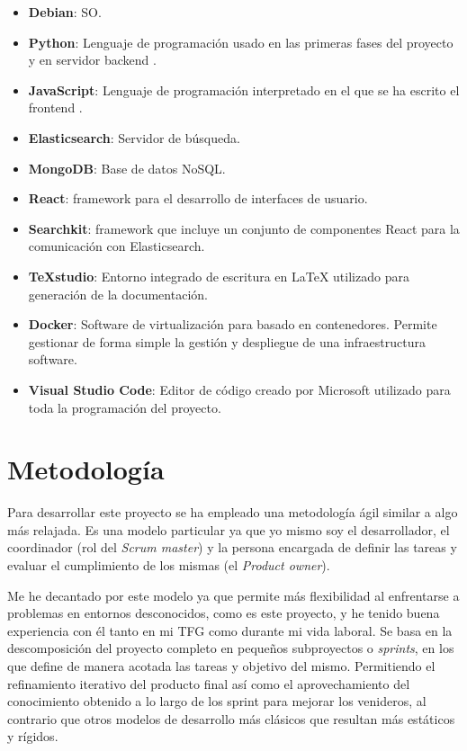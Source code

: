 \begin{itemize}
	\item \textbf{Debian}: \acrfull{SO}.
	\item \textbf{Python}: Lenguaje de programación usado en las primeras fases del proyecto y en servidor \gls{backend} .
	\item \textbf{JavaScript}: Lenguaje de programación interpretado en el que se ha escrito el \gls{frontend} .
	\item \textbf{Elasticsearch}: Servidor de búsqueda.
	\item \textbf{MongoDB}: Base de datos NoSQL.
	\item \textbf{React}:  \Gls{framework} para el desarrollo de interfaces de usuario.
	\item \textbf{Searchkit}: \Gls{framework} que incluye un conjunto de componentes React para la comunicación con Elasticsearch.
	\item \textbf{TeXstudio}: Entorno integrado de escritura en \LaTeX{} utilizado para generación de la documentación.
	\item \textbf{Docker}: Software de virtualización para basado en contenedores. Permite gestionar de forma simple la gestión y despliegue de una infraestructura software.
	\item \textbf{Visual Studio Code}: Editor de código creado por Microsoft utilizado para toda la programación del proyecto.
	
\end{itemize}

\section{Metodología}
\label{sc:metodologia}
Para desarrollar este proyecto se ha empleado una metodología ágil similar a \textit{}  algo más relajada. Es una modelo particular ya que yo mismo soy el desarrollador, el coordinador (rol del \textit{Scrum master}) y la persona encargada de definir las tareas y evaluar el cumplimiento de los mismas (el \textit{Product owner}).

Me he decantado por este modelo ya que permite más flexibilidad al enfrentarse a problemas en entornos desconocidos, como es este proyecto, y he tenido buena experiencia con él tanto en mi \acrshort{TFG} como durante mi vida laboral. Se basa en la descomposición del proyecto completo en pequeños subproyectos o \textit{sprints}, en los que define de manera acotada las tareas y objetivo del mismo. Permitiendo el refinamiento iterativo del producto final así como el aprovechamiento del conocimiento obtenido a lo largo de los sprint para mejorar los venideros, al contrario que otros modelos de desarrollo más clásicos que resultan más estáticos y rígidos.

